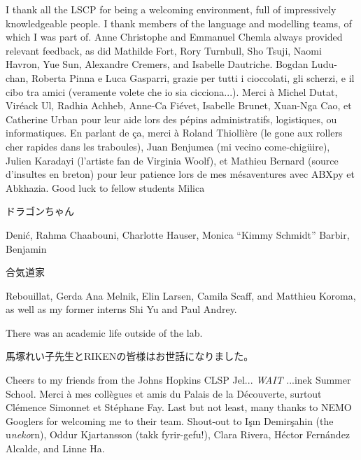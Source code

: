 \documentclass[12pt, twoside]{report}
\begin{document}
I thank all the LSCP for being a welcoming environment, full of impressively knowledgeable people. I thank members of the language and modelling teams, of which I was part of. Anne Christophe and Emmanuel Chemla always provided relevant feedback, as did Mathilde Fort, Rory Turnbull, Sho Tsuji, Naomi Havron, Yue Sun, Alexandre Cremers, and Isabelle Dautriche. Bogdan Ludu-chan, Roberta Pinna e Luca Gasparri, grazie per tutti i cioccolati, gli scherzi, e il cibo tra amici (veramente volete che io sia cicciona...). Merci à Michel Dutat, Viréack Ul, Radhia Achheb, Anne-Ca Fiévet, Isabelle Brunet, Xuan-Nga Cao, et Catherine Urban pour leur aide lors des pépins administratifs, logistiques, ou informatiques. En parlant de ça, merci à Roland Thiollière (le gone aux rollers cher rapides dans les traboules), Juan Benjumea (mi vecino come-chigüire), Julien Karadayi (l'artiste fan de Virginia Woolf), et Mathieu Bernard (source d'insultes en breton) pour leur patience lors de mes mésaventures avec ABXpy et Abkhazia. Good luck to fellow students Milica \begin{CJK}{UTF8}{min}ドラゴンちゃん\end{CJK} Denić, Rahma Chaabouni, Charlotte Hauser, Monica ``Kimmy Schmidt'' Barbir, Benjamin \begin{CJK}{UTF8}{min}合気道家\end{CJK} Rebouillat, Gerda Ana Melnik, Elin Larsen, Camila Scaff, and Matthieu Koroma, as well as my former interns Shi Yu and Paul Andrey.

There was an academic life outside of the lab. \begin{CJK}{UTF8}{min}馬塚れい子先生とRIKENの皆様はお世話になりました。\end{CJK} Cheers to my friends from the Johns Hopkins CLSP Jel... \textit{WAIT} ...inek Summer School. Merci à mes collègues et amis du Palais de la Découverte, surtout Clémence Simonnet et Stéphane Fay. Last but not least, many thanks to NEMO Googlers for welcoming me to their team. Shout-out to Işın Demirşahin (the u\textit{neko}rn), Oddur Kjartansson (takk fyrir-gef\textipa{\dh}u!), Clara Rivera, Héctor Fernández Alcalde, and Linne Ha.   
\end{document}
